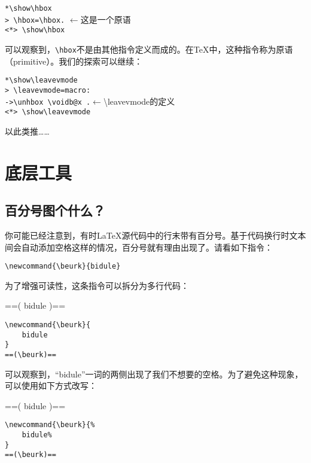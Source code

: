\begin{dmd}
\verb|*\show\hbox|\\
\verb|> \hbox=\hbox.| \quad $\leftarrow$\textsf{这是一个原语}\\
\verb|<*> \show\hbox|
\end{dmd}

可以观察到，\verb|\hbox|不是由其他指令定义而成的。在\TeX 中，这种指令称为原语（primitive）。我们的探索可以继续：

\begin{dmd}
\verb|*\show\leavevmode|\\
\verb|> \leavevmode=macro:|\\
\verb|->\unhbox \voidb@x .|\quad $\leftarrow$\backslash leavevmode\textsf{的定义}\\
\verb|<*> \show\leavevmode|
\end{dmd}

以此类推……

\section{底层工具}

\subsection{百分号图个什么？}

你可能已经注意到，有时\LaTeX 源代码中的行末带有百分号\dm{\%}。基于代码换行时文本间会自动添加空格这样的情况，百分号就有理由出现了。请看如下指令：

\begin{dmd}
\verb|\newcommand{\beurk}{bidule}|
\end{dmd}

为了增强可读性，这条指令可以拆分为多行代码：

\begin{codelist}[9.1]{
\newcommand{\beurk}{
    bidule
}
==(\beurk)==
}\begin{verbatim}
\newcommand{\beurk}{
    bidule
}
==(\beurk)==
\end{verbatim}
\end{codelist}

可以观察到，“bidule”一词的两侧出现了我们不想要的空格。为了避免这种现象，可以使用如下方式改写：


\begin{codelist}[9.2]{
\newcommand{\beurk}{%
    bidule%
}
==(\beurk)==
}\begin{verbatim}
\newcommand{\beurk}{%
    bidule%
}
==(\beurk)==
\end{verbatim}
\end{codelist}

